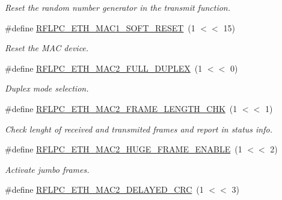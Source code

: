 \begin{DoxyCompactItemize}
\begin{DoxyCompactList}\small\item\em Reset the random number generator in the transmit function. \end{DoxyCompactList}\item 
\hypertarget{group__eth_gac84bc7c26b84a052a2b31449570e99e8}{\#define \hyperlink{group__eth_gac84bc7c26b84a052a2b31449570e99e8}{R\-F\-L\-P\-C\-\_\-\-E\-T\-H\-\_\-\-M\-A\-C1\-\_\-\-S\-O\-F\-T\-\_\-\-R\-E\-S\-E\-T}~(1 $<$$<$ 15)}\label{group__eth_gac84bc7c26b84a052a2b31449570e99e8}

\begin{DoxyCompactList}\small\item\em Reset the M\-A\-C device. \end{DoxyCompactList}\item 
\hypertarget{group__eth_ga595450337e66c8970c766bbe46e42eef}{\#define \hyperlink{group__eth_ga595450337e66c8970c766bbe46e42eef}{R\-F\-L\-P\-C\-\_\-\-E\-T\-H\-\_\-\-M\-A\-C2\-\_\-\-F\-U\-L\-L\-\_\-\-D\-U\-P\-L\-E\-X}~(1 $<$$<$ 0)}\label{group__eth_ga595450337e66c8970c766bbe46e42eef}

\begin{DoxyCompactList}\small\item\em Duplex mode selection. \end{DoxyCompactList}\item 
\hypertarget{group__eth_gabafe35d8637a7adcea674b197e05144a}{\#define \hyperlink{group__eth_gabafe35d8637a7adcea674b197e05144a}{R\-F\-L\-P\-C\-\_\-\-E\-T\-H\-\_\-\-M\-A\-C2\-\_\-\-F\-R\-A\-M\-E\-\_\-\-L\-E\-N\-G\-T\-H\-\_\-\-C\-H\-K}~(1 $<$$<$ 1)}\label{group__eth_gabafe35d8637a7adcea674b197e05144a}

\begin{DoxyCompactList}\small\item\em Check lenght of received and transmited frames and report in status info. \end{DoxyCompactList}\item 
\hypertarget{group__eth_gabf0c1a6c1ec54327e5781b278981faf0}{\#define \hyperlink{group__eth_gabf0c1a6c1ec54327e5781b278981faf0}{R\-F\-L\-P\-C\-\_\-\-E\-T\-H\-\_\-\-M\-A\-C2\-\_\-\-H\-U\-G\-E\-\_\-\-F\-R\-A\-M\-E\-\_\-\-E\-N\-A\-B\-L\-E}~(1 $<$$<$ 2)}\label{group__eth_gabf0c1a6c1ec54327e5781b278981faf0}

\begin{DoxyCompactList}\small\item\em Activate jumbo frames. \end{DoxyCompactList}\item 
\hypertarget{group__eth_gaf0231e7de8b5d2058555f6ff5e1bb2de}{\#define \hyperlink{group__eth_gaf0231e7de8b5d2058555f6ff5e1bb2de}{R\-F\-L\-P\-C\-\_\-\-E\-T\-H\-\_\-\-M\-A\-C2\-\_\-\-D\-E\-L\-A\-Y\-E\-D\-\_\-\-C\-R\-C}~(1 $<$$<$ 3)}\label{group__eth_gaf0231e7de8b5d2058555f6ff5e1bb2de}


\end{DoxyCompactItemize}
